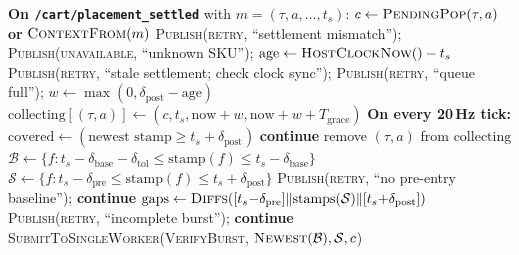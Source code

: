 \documentclass[conference]{IEEEtran}
\begin{document}
\begin{algorithm}[!t]
\caption{Settlement-triggered burst assembly (PC)}
\label{alg:burst}
\footnotesize
\begin{algorithmic}[1]
\Statex \textbf{On \texttt{/cart/placement\_settled}} with $m=(\tau,a,\ldots,t_s)$:
 \State \Return {} \EndIf
\State $c \gets \textsc{PendingPop}(\tau,a)$ \textbf{or} $\textsc{ContextFrom}(m)$
  \State \textsc{Publish}(\textsc{retry}, ``settlement mismatch''); \Return \EndIf
{}
  \State \textsc{Publish}(\textsc{unavailable}, ``unknown SKU''); \Return \EndIf
\State $\mathrm{age}\gets\textsc{HostClockNow}()-t_s$
  \State \textsc{Publish}(\textsc{retry}, ``stale settlement; check clock sync''); \Return \EndIf
{}
  \State \textsc{Publish}(\textsc{retry}, ``queue full''); \Return \EndIf
\State $w\gets\max(0,\delta_{\mathrm{post}}-\mathrm{age})$
\State $\mathrm{collecting}[(\tau,a)]\gets(c,t_s,\mathrm{now}{+}w,\mathrm{now}{+}w{+}T_{\mathrm{grace}})$
\Statex \textbf{On every 20\,Hz tick:}
  \State $\mathrm{covered}\gets(\text{newest stamp}\ge t_s+\delta_{\mathrm{post}})$
    \State \textbf{continue}  \EndIf
  \State remove $(\tau,a)$ from $\mathrm{collecting}$
  \State $\mathcal{B}\gets\{f : t_s{-}\delta_{\mathrm{base}}{-}\delta_{\mathrm{tol}}\le
         \mathrm{stamp}(f)\le t_s{-}\delta_{\mathrm{base}}\}$
  \State $\mathcal{S}\gets\{f : t_s{-}\delta_{\mathrm{pre}}\le\mathrm{stamp}(f)\le
         t_s{+}\delta_{\mathrm{post}}\}$
    \State \textsc{Publish}(\textsc{retry}, ``no pre-entry baseline''); \textbf{continue} \EndIf
  \State $\mathrm{gaps}\gets\textsc{Diffs}([t_s{-}\delta_{\mathrm{pre}}]\|
         \mathrm{stamps}(\mathcal{S})\|[t_s{+}\delta_{\mathrm{post}}])$
    \State \textsc{Publish}(\textsc{retry}, ``incomplete burst''); \textbf{continue} \EndIf
  \State \textsc{SubmitToSingleWorker}(\textsc{VerifyBurst}, $\textsc{Newest}(\mathcal{B}),
         \mathcal{S}, c$)
\EndFor
\end{algorithmic}
\end{algorithm}
\end{document}
